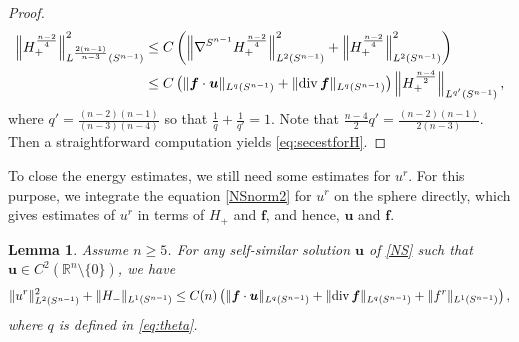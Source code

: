 \documentclass[12pt]{amsart}
\newtheorem{lemma}[theorem]{Lemma}
\renewcommand{\div}{{\rm div \thinspace }}
\newcommand{\Bu}{{\boldsymbol{u}}}
\newcommand{\Bf}{{\boldsymbol{f}}}
\begin{document}
\begin{proof}
\begin{equation}
			\begin{aligned}
				\left\|H_+^{\frac{n-2}{4}}\right\|_{L^{\frac{2(n-1)}{n-3}}(S^{n-1})}^2 &\leq C\left(\left\|\nabla^{S^{n-1}} H_+^{\frac{n-2}{4}}\right\|_{L^{2}(S^{n-1})}^2 + \left\| H_+^{\frac{n-2}{4}}\right\|_{L^{2}(S^{n-1})}^2\right)\\       
				&\leq C\left( \|\Bf\cdot \Bu\|_{L^q(S^{n-1})} + \|\div \Bf\|_{L^q(S^{n-1})} \right)\left\|H_+^{\frac{n-4}{2}}\right\|_{L^{q'}(S^{n-1})},
			\end{aligned}
		\end{equation}
		where  
		$q'=\frac{(n-2)(n-1)}{(n-3)(n-4)}$ so that $\frac{1}{q}+\frac{1}{q'}=1$. Note that $\frac{n-4}{2} q'= \frac{(n-2)(n-1)}{2(n-3)}$. Then a straightforward computation yields  \eqref{eq:secestforH}.
	\end{proof} 
	
	
	To close the energy estimates, we still need some estimates for $u^r$. For this purpose, we integrate the equation \eqref{NSnorm2}  for $u^r$ on the sphere directly, which gives estimates of $u^r$ in terms of  $H_+$ and $\Bf$, and hence, $\Bu$ and $\Bf$. 
	\begin{lemma}\label{lem:urestim}
		Assume  $n\geq 5$.  For any self-similar solution $\Bu$ of \eqref{NS} such that $\Bu \in C^2(\mathbb{R}^n \setminus\{0\})$, we have 
		\begin{equation}\label{eq:L2estur1}
			\|u^r\|_{L^2(S^{n-1})}^2 + \|H_-\|_{L^1(S^{n-1})} \leq C(n)\left( \|\Bf\cdot \Bu\|_{L^q(S^{n-1})} + \|\div \Bf\|_{L^q(S^{n-1})}  +    \|f^r\|_{L^1(S^{n-1})} \right),
		\end{equation}
		where $q$ is defined in \eqref{eq:theta}.
	\end{lemma}
	
\end{document}
